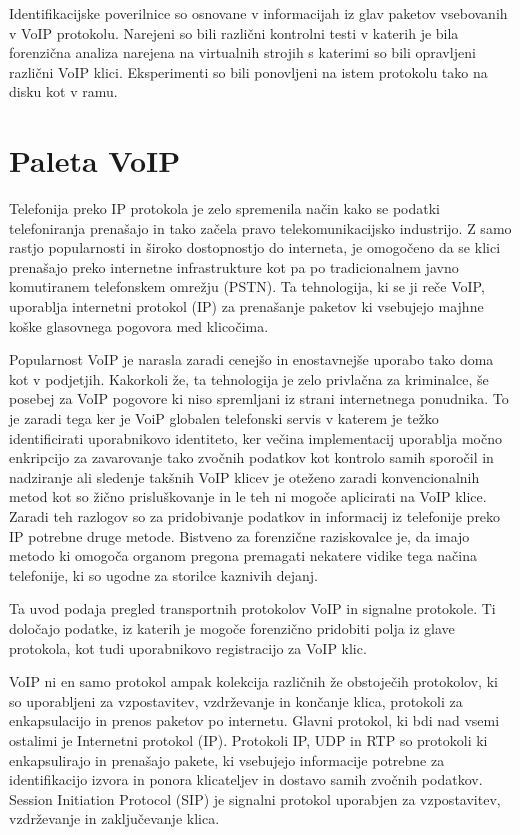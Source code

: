 \documentclass{acm_proc_article-sp}
\begin{document}
Identifikacijske poverilnice so osnovane v informacijah iz glav paketov vsebovanih v VoIP protokolu. Narejeni so bili različni kontrolni testi v katerih je bila forenzična analiza narejena na virtualnih strojih s katerimi so bili opravljeni različni VoIP klici. Eksperimenti so bili ponovljeni na istem protokolu tako na disku kot v ramu.

\section{Paleta VoIP}
Telefonija preko IP protokola je zelo spremenila način kako se podatki telefoniranja prenašajo in tako začela pravo telekomunikacijsko industrijo. Z samo rastjo popularnosti in široko dostopnostjo do interneta, je omogočeno da se klici prenašajo preko internetne infrastrukture kot pa po tradicionalnem javno komutiranem telefonskem omrežju (PSTN). Ta tehnologija, ki se ji reče VoIP, uporablja internetni protokol (IP) za prenašanje paketov ki vsebujejo majhne koške glasovnega pogovora med klicočima.

Popularnost VoIP je narasla zaradi cenejšo in enostavnejše uporabo tako doma kot v podjetjih. Kakorkoli že, ta tehnologija je zelo privlačna za kriminalce, še posebej za VoIP pogovore ki niso spremljani iz strani internetnega ponudnika. To je zaradi tega ker je VoiP globalen telefonski servis v katerem je težko identificirati uporabnikovo identiteto, ker večina implementacij uporablja močno enkripcijo za zavaro\-vanje tako zvočnih podatkov kot kontrolo samih sporočil in nadziranje ali sledenje takšnih VoIP klicev je oteženo zaradi konvencionalnih metod kot so žično prisluškovanje in le teh ni mogoče aplicirati na VoIP klice. Zaradi teh razlogov so za pridobivanje podatkov in informacij iz telefonije preko IP potrebne druge metode. Bistveno za forenzične raziskovalce je, da imajo metodo ki omogoča organom pregona premagati nekatere vidike tega načina telefonije, ki so ugodne za storilce kaznivih dejanj.

Ta uvod podaja pregled transportnih protokolov VoIP in signalne protokole. Ti določajo podatke, iz katerih je mogoče forenzično pridobiti polja iz glave protokola, kot tudi uporabnikovo registracijo za VoIP klic.

VoIP ni en samo protokol ampak kolekcija različnih že obstoječih protokolov, ki so uporabljeni za vzpostavitev, vzdrževanje in končanje klica, protokoli za enkapsulacijo in prenos paketov po internetu. Glavni protokol, ki bdi nad vsemi ostalimi je Internetni protokol (IP).
Protokoli IP, UDP in RTP so protokoli ki enkapsulirajo in prenašajo pakete, ki vsebujejo informacije potrebne za identifikacijo izvora in ponora klicateljev in dostavo samih zvočnih podatkov. Session Initiation Protocol (SIP) je signalni protokol uporabjen za vzpostavitev, vzdrževanje in zaključevanje klica.
\end{document}
